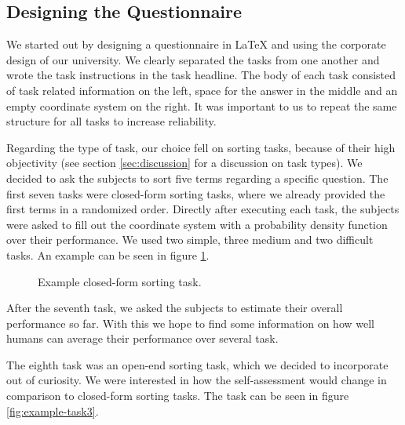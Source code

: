 \documentclass[../main/main.tex]{subfiles}
\begin{document}
	
	
	\subsection{Designing the Questionnaire}
	
	We started out by designing a questionnaire in LaTeX \citep{lamport1994latex} and using the corporate design of our university. We clearly separated the tasks from one another and wrote the task instructions in the task headline. The body of each task consisted of task related information on the left, space for the answer in the middle and an empty coordinate system on the right. It was important to us to repeat the same structure for all tasks to increase reliability.
	
	Regarding the type of task, our choice fell on sorting tasks, because of their high objectivity (see section \ref{sec:discussion} for a discussion on task types). We decided to ask the subjects to sort five terms regarding a specific question. The first seven tasks were closed-form sorting tasks, where we already provided the first terms in a randomized order. Directly after executing each task, the subjects were asked to fill out the coordinate system with a probability density function over their performance. We used two simple, three medium and two difficult tasks. An example can be seen in figure \ref{fig:example-task}.
	
	\begin{figure}[h]
		\centering
		\captionsetup{justification=centering}
		\caption{Example closed-form sorting task.}
		\label{fig:example-task}
	\end{figure} 
	
	\noindent After the seventh task, we asked the subjects to estimate their overall performance so far. With this we hope to find some information on how well humans can average their performance over several task. 
		
	 The eighth task was an open-end sorting task, which we decided to incorporate out of curiosity. We were interested in how the self-assessment would change in comparison to closed-form sorting tasks. The task can be seen in figure \ref{fig:example-task3}.
	 
\end{document}
